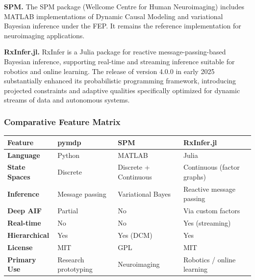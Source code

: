 \documentclass[
]{article}
\newcounter{none} %
\begin{document}
\textbf{SPM.} The SPM package (Wellcome Centre for Human Neuroimaging)
includes MATLAB implementations of Dynamic Causal Modeling and
variational Bayesian inference under the FEP. It remains the reference
implementation for neuroimaging applications.

\textbf{RxInfer.jl.} RxInfer is a Julia package for reactive
message-passing-based Bayesian inference, supporting real-time and
streaming inference suitable for robotics and online learning. The
release of version 4.0.0 in early 2025 \citep{rxinfer2025} substantially
enhanced its probabilistic programming framework, introducing projected
constraints and adaptive qualities specifically optimized for dynamic
streams of data and autonomous systems.

\subsubsection{Comparative Feature
Matrix}\label{comparative-feature-matrix}

{\def\LTcaptype{none} %
\begin{longtable}[]{@{}
  >{\raggedright\arraybackslash}p{}
  >{\raggedright\arraybackslash}p{}
  >{\raggedright\arraybackslash}p{}
  >{\raggedright\arraybackslash}p{}@{}}
\toprule\noalign{}
\begin{minipage}[b]{\linewidth}\raggedright
Feature
\end{minipage} & \begin{minipage}[b]{\linewidth}\raggedright
pymdp
\end{minipage} & \begin{minipage}[b]{\linewidth}\raggedright
SPM
\end{minipage} & \begin{minipage}[b]{\linewidth}\raggedright
RxInfer.jl
\end{minipage} \\
\midrule\noalign{}
\endhead
\bottomrule\noalign{}
\endlastfoot
\textbf{Language} & Python & MATLAB & Julia \\
\textbf{State Spaces} & Discrete & Discrete + Continuous & Continuous
(factor graphs) \\
\textbf{Inference} & Message passing & Variational Bayes & Reactive
message passing \\
\textbf{Deep AIF} & Partial & No & Via custom factors \\
\textbf{Real-time} & No & No & Yes (streaming) \\
\textbf{Hierarchical} & Yes & Yes (DCM) & Yes \\
\textbf{License} & MIT & GPL & MIT \\
\textbf{Primary Use} & Research prototyping & Neuroimaging & Robotics /
online learning \\
\end{longtable}
}
\end{document}
